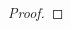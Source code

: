\documentclass[12pt]{article}
\begin{document}

\begin{problem}{1}
\end{problem} 
\begin{solution} \ 
    \begin{subprob}
        \item
        \item
    \end{subprob}
\end{solution}
\begin{problem}{2}
\end{problem}
\begin{proof}
\end{proof}
\end{document}

